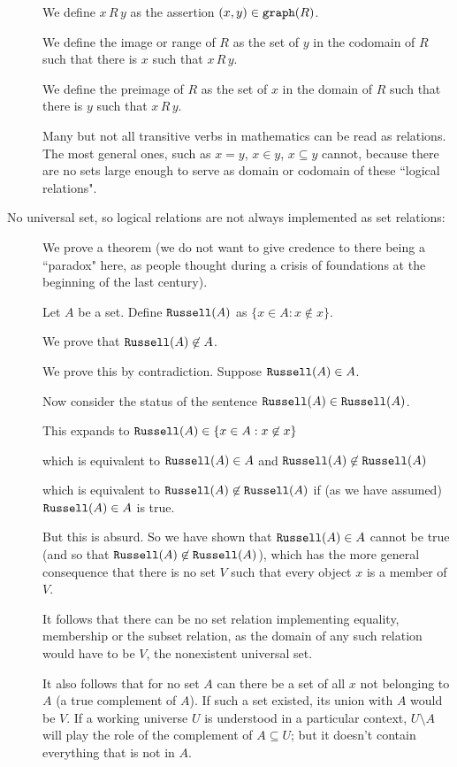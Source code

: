 \documentclass[12pt]{article}
\begin{document}
\begin{description}
We define $x \,R\, y$ as the assertion $(x,y) \in {\tt graph}(R)$.

We define the image or range of $R$ as the set of $y$ in the codomain of $R$ such that there is $x$ such that $x \, R \, y$.

We define the preimage of $R$ as the set of $x$ in the domain of $R$ such that there is $y$ such that $x \, R \, y$.

Many but not all transitive verbs in mathematics can be read as relations.  The most general ones, such
as $x = y$, $x \in y$, $x \subseteq y$ cannot, because there are no sets large enough to serve as domain or codomain of these ``logical relations".

\item[No universal set, so logical relations are not always implemented as set relations:]

We prove a theorem (we do not want to give credence to there being a ``paradox" here, as people thought during a crisis of foundations at the beginning of the last century).

Let $A$ be a set.  Define ${\tt Russell}(A)$ as $\{x \in A:x \not\in x\}$.

We prove that ${\tt Russell}(A)\not\in A$.

We prove this by contradiction.  Suppose ${\tt Russell}(A)\in A$.  

Now consider the status of the sentence ${\tt Russell}(A) \in {\tt Russell}(A)$.

This expands to ${\tt Russell}(A) \in \{x \in A:x \not\in x\}$

which is equivalent to ${\tt Russell}(A) \in A$ and ${\tt Russell}(A) \not\in {\tt Russell}(A)$

which is equivalent to ${\tt Russell}(A) \not\in {\tt Russell}(A)$ if (as we have assumed) ${\tt Russell}(A)\in A$ is true.

But this is absurd.  So we have shown that ${\tt Russell}(A)\in A$  cannot be true (and so that ${\tt Russell}(A) \not\in {\tt Russell}(A)$), which has the more general consequence
that there is no set $V$ such that every object $x$ is a member of $V$.

It follows that there can be no set relation implementing equality, membership or the subset relation, as the domain of any such relation would have to be $V$, the nonexistent universal set.

It also follows that for no set $A$ can there be a set of all $x$ not belonging to $A$ (a true complement of $A$).
If such a set existed, its union with $A$ would be $V$.  If a working universe $U$ is understood in a particular context,
$U \setminus A$ will play the role of the complement of $A \subseteq U$;  but it doesn't contain everything that is not in $A$.




\end{description}
\end{document}
